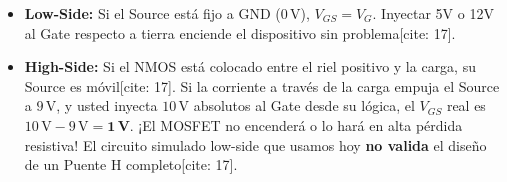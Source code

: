 \documentclass[11pt, a4paper]{article}
\begin{document}
\begin{itemize}
    \item \textbf{Low-Side:} Si el Source está fijo a GND ($0\,\text{V}$), $V_{GS} = V_G$. Inyectar 5V o 12V al Gate respecto a tierra enciende el dispositivo sin problema[cite: 17].
    \item \textbf{High-Side:} Si el NMOS está colocado entre el riel positivo y la carga, su Source es móvil[cite: 17]. Si la corriente a través de la carga empuja el Source a $9\,\text{V}$, y usted inyecta $10\,\text{V}$ absolutos al Gate desde su lógica, el $V_{GS}$ real es $10\,\text{V} - 9\,\text{V} = \mathbf{1\,\text{V}}$. ¡El MOSFET no encenderá o lo hará en alta pérdida resistiva! El circuito simulado low-side que usamos hoy \textbf{no valida} el diseño de un Puente H completo[cite: 17].
\end{itemize}
\end{document}
